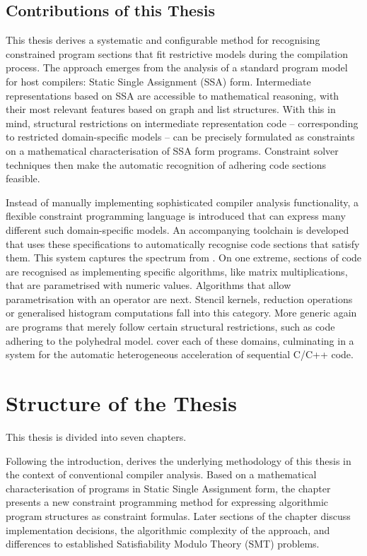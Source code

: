 \subsection{Contributions of this Thesis}

    This thesis derives a systematic and configurable method for recognising
    constrained program sections that fit restrictive models during the
    compilation process.
    The approach emerges from the analysis of a standard program model for
    host compilers: Static Single Assignment (SSA) form.
    Intermediate representations based on SSA are accessible to mathematical
    reasoning, with their most relevant features based on graph and list
    structures.
    With this in mind, structural restrictions on intermediate representation
    code -- corresponding to restricted domain-specific models -- can be
    precisely formulated as constraints on a mathematical characterisation of
    SSA form programs.
    Constraint solver techniques then make the automatic recognition of
    adhering code sections feasible.

    Instead of manually implementing sophisticated compiler analysis
    functionality, a flexible constraint programming language is introduced
    that can express many different such domain-specific models.
    An accompanying toolchain is developed that uses these specifications to
    automatically recognise code sections that satisfy them.
    This system captures the spectrum from .
    On one extreme, sections of code are recognised as implementing
    specific algorithms, like matrix multiplications, that are parametrised with
    numeric values.
    Algorithms that allow parametrisation with an operator are next.
    Stencil kernels, reduction operations or generalised histogram computations
    fall into this category.
    More generic again are programs that merely follow certain structural
    restrictions, such as code adhering to the polyhedral model.
     cover each of these
    domains, culminating in a system for the automatic heterogeneous
    acceleration of sequential C/C++ code.

\section{Structure of the Thesis}

    This thesis is divided into seven chapters.

    Following the introduction, {\bf{}} derives the
    underlying methodology of this thesis in the context of conventional
    compiler analysis.
    Based on a mathematical characterisation of programs in Static Single
    Assignment form, the chapter presents a new constraint programming method
    for expressing algorithmic program structures as constraint formulas.
    Later sections of the chapter discuss implementation decisions,
    the algorithmic complexity of the approach, and differences to established
    Satisfiability Modulo Theory (SMT) problems.

